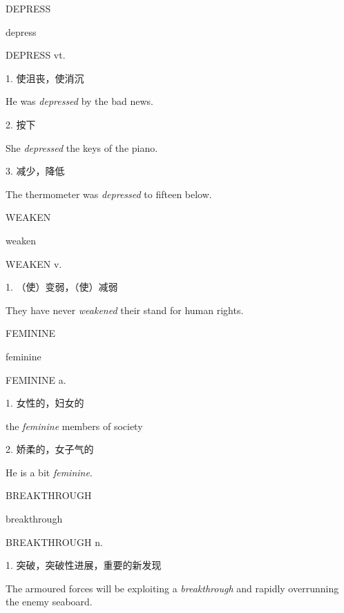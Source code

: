 \begin{flashcard}{
DEPRESS

depress
}
\begin{center}
DEPRESS vt. 
\end{center}
1. 使沮丧，使消沉

He was \textit{depressed} by the bad news.

2. 按下

She \textit{depressed} the keys of the piano.

3. 减少，降低

The thermometer was \textit{depressed} to fifteen below.

\end{flashcard}
\begin{flashcard}{
WEAKEN

weaken
}
\begin{center}
WEAKEN v. 
\end{center}
1. （使）变弱，（使）减弱

They have never \textit{weakened} their stand for human rights.

\end{flashcard}
\begin{flashcard}{
FEMININE

feminine
}
\begin{center}
FEMININE a. 
\end{center}
1. 女性的，妇女的

the \textit{feminine} members of society

2. 娇柔的，女子气的

He is a bit \textit{feminine}.

\end{flashcard}
\begin{flashcard}{
BREAKTHROUGH

breakthrough
}
\begin{center}
BREAKTHROUGH n. 
\end{center}
1. 突破，突破性进展，重要的新发现

The armoured forces will be exploiting a \textit{breakthrough} and rapidly overrunning the enemy seaboard.

\end{flashcard}
